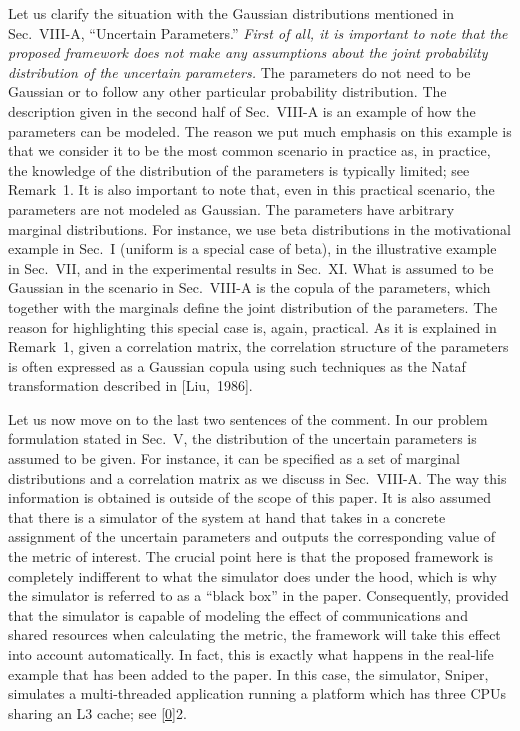 \begin{authors}
Let us clarify the situation with the Gaussian distributions mentioned in
Sec.~VIII-A, ``Uncertain Parameters.'' \emph{First of all, it is important to
note that the proposed framework does not make any assumptions about the joint
probability distribution of the uncertain parameters.} The parameters do not
need to be Gaussian or to follow any other particular probability distribution.
The description given in the second half of Sec.~VIII-A is an example of how the
parameters can be modeled. The reason we put much emphasis on this example is
that we consider it to be the most common scenario in practice as, in practice,
the knowledge of the distribution of the parameters is typically limited; see
Remark~1. It is also important to note that, even in this practical scenario,
the parameters are not modeled as Gaussian. The parameters have arbitrary
marginal distributions. For instance, we use beta distributions in the
motivational example in Sec.~I (uniform is a special case of beta), in the
illustrative example in Sec.~VII, and in the experimental results in Sec.~XI.
What is assumed to be Gaussian in the scenario in Sec.~VIII-A is the copula of
the parameters, which together with the marginals define the joint distribution
of the parameters. The reason for highlighting this special case is, again,
practical. As it is explained in Remark~1, given a correlation matrix, the
correlation structure of the parameters is often expressed as a Gaussian copula
using such techniques as the Nataf transformation described in [Liu,~1986].

Let us now move on to the last two sentences of the comment. In our problem
formulation stated in Sec.~V, the distribution of the uncertain parameters is
assumed to be given. For instance, it can be specified as a set of marginal
distributions and a correlation matrix as we discuss in Sec.~VIII-A. The way
this information is obtained is outside of the scope of this paper. It is also
assumed that there is a simulator of the system at hand that takes in a concrete
assignment of the uncertain parameters and outputs the corresponding value of
the metric of interest. The crucial point here is that the proposed framework is
completely indifferent to what the simulator does under the hood, which is why
the simulator is referred to as a ``black box'' in the paper. Consequently,
provided that the simulator is capable of modeling the effect of communications
and shared resources when calculating the metric, the framework will take this
effect into account automatically. In fact, this is exactly what happens in the
real-life example that has been added to the paper. In this case, the simulator,
Sniper, simulates a multi-threaded application running a platform which has
three CPUs sharing an L3 cache; see \cref{0}{2}.


\end{authors}

